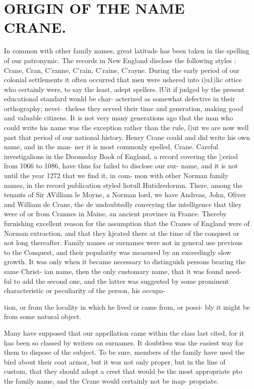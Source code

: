 \documentclass[oneside]{book}
\begin{document}
\chapter{ORIGIN OF THE NAME CRANE.}


In common with other family names, great latitude has been 
taken in the spelling of our patronymic. The records in New 
England disclose the following styles : Crane, Cran, C'ranne, 
C'rain, C'raine, C'rayne. During the early period of our colonial 
settlements it often occurred that men were ushered into i)u1)lic 
ottice who certainly were, to say the least, adept spellers. lUit 
if judged by the present educational standard wonld be char- 
acterized as somewhat defective in their orthography; nevei-- 
theless they served their time and generation, making good and 
valuable citizens. It is not very many generations ago that the 
man who could write his name was the exception rather than the 
rule, l)ut we are now well past that period of our national history. 
Henry Crane could and did write his own name, and in the man- 
ner it is most commonly spelled, Crane. Careful investigalions 
in the Doomsday Book of England, a record covering the ];eriod 
from 1066 to 1086, have thus far failed to disclose our sur- 
name, and it is not until the year 1272 that we find it, in com- 
mon with other Norman family names, in the record publication 
styled liotull Hutidredormn. There, among the tenants of Sir 
AVilliam le Moyne, a Norman lord, we have Andreas, John, 
Oliver and William de Crane, the de undoubtedly conveying the 
intelligence that tliey were of or from Crannes in Maine, an 
ancient province in France. Thereby furnishing excellent reason 
for the assumption that the Cranes of England were of Norman 
extraction, and that they kjcated there at the time of the conquest 
or not long thereafter. Family names or surnames were not in 
general use previous to the Conquest, and their popularity was 
measured by an exceedingly slow growth. It was only when it 
became necessary to distinguish persons bearing the same Christ- 
ian name, then the only customary name, that it was found need- 
ful to add the second one, and the latter was suggested by some 
prominent characteristic or peculiarity of the person, his occupa- 




tion, or from the locality in which he lived or came from, or possi- 
bly it might be from some natural object. 

Many have supposed that our appellation came within the class 
last cited, for it has been so classed by writers on surnames. It 
doubtless was the easiest way for them to dispose of the subject. 
To be sure, members of the family have used the bird about their 
coat armor, but it was not only proper, but in the line of custom, 
that they should adopt a crest that would be the most appropriate 
pto the family name, and the Crane would certainly not be inap- 
propriate. 
\end{document}
